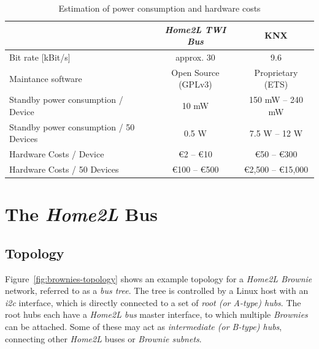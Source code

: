 \documentclass[12pt,english,parskip=half,headheight=19pt]{scrreprt}
\begin{document}
\begin{table}[ht]
  \centering
  \renewcommand{\arraystretch}{1.4}
  \begin{tabular}{l||c|c}
    & \textit{Home2L TWI Bus} & KNX \\
    \hline \hline
    Bit rate [kBit/s]
      & approx. 30            & 9.6 \\
    \hline Maintance software
      & Open Source (GPLv3) & Proprietary (ETS) \\
    \hline Standby power consumption / Device \footnotemark[1]
      & 10 mW      & 150 mW -- 240 mW \\
    \hline Standby power consumption / 50 Devices
      & 0.5 W      & 7.5 W -- 12 W \\
    \hline Hardware Costs / Device \footnotemark[2]
      & €2 -- €10     & €50 -- €300 \\
    \hline Hardware Costs / 50 Devices
      & €100 -- €500  & €2,500 -- €15,000
  \end{tabular}
  \caption[l]{Estimation of power consumption and hardware costs}
  \label{tab:brownies-costs}
\end{table}



\clearpage   %





\section{The \textit{Home2L} Bus}
\label{sec:brownies-bus}



\subsection{Topology}
\label{sec:brownies-bus-topology}

Figure~\ref{fig:brownies-topology} shows an example topology for a \textit{Home2L Brownie} network, referred to as a \textit{bus tree}. The tree is controlled by a Linux host with an \textit{i2c} interface, which is directly connected to a set of \textit{root (or A-type) hubs}. The root hubs each have a \textit{Home2L bus} master interface, to which multiple \textit{Brownies} can be attached. Some of these may act as \textit{intermediate (or B-type) hubs}, connecting other \textit{Home2L} buses or \textit{Brownie subnets}.
\end{document}
